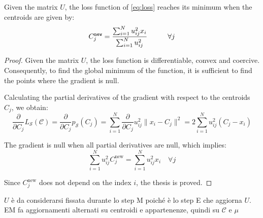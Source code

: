 \begin{theorem}
	\label{thm:Mupdate}
    Given the matrix $U$, the loss function of \cref{eq:loss} reaches its minimum when the centroids are given by:
    \begin{equation}
        C^{\texttt{new}}_j = \frac{\sum_{i=1}^Nu_{ij}^2x_{i}}{\sum_{i=1}^Nu_{ij}^2} \text{\hspace{1cm}} \forall j
    \end{equation}
	\begin{proof}
	    Given the matrix $U$, the loss function is differentiable, convex and coercive. Consequently, to find the global minimum of the function, it is sufficient to find the points where the gradient is null.

	    \noindent Calculating the partial derivatives of the gradient with respect to the centroids $C_j$, we obtain:
	\begin{equation*}
	    \frac{\partial}{\partial C_{j}} L_\mathcal{S}(\mathcal{C}) = \frac{\partial}{\partial C_{j}} p_\mathcal{S}(C_j) = \sum_{i=1}^N\frac{\partial}{\partial C_{j}} u_{ij}^2\|x_i-C_j\|^2 = 2\sum_{i=1}^N u_{ij}^2\left(C_{j}-x_{i}\right)
	\end{equation*}

	\noindent The gradient is null when all partial derivatives are null, which implies:
	\begin{equation*}
	    \sum_{i=1}^N u_{ij}^2C^{\text{new}}_{j} = \sum_{i=1}^N u_{ij}^2x_{i} \quad \forall j
	\end{equation*}

	\noindent Since $C^{\text{new}}_j$ does not depend on the index $i$, the thesis is proved.
	\end{proof}

	\begin{note}
		$U$ è da considerarsi fissata durante lo step M poiché è lo step E che aggiorna $U$. EM fa aggiornamenti alternati su centroidi e appartenenze, quindi su $\mathcal{C}$ e $\mu$
	\end{note}
\end{theorem}

